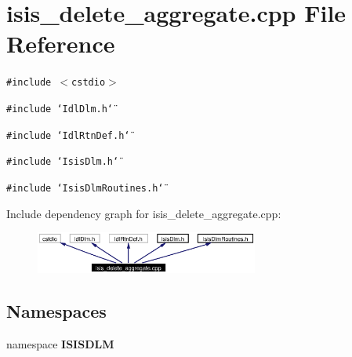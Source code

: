 \section{isis\_\-delete\_\-aggregate.cpp File Reference}
\label{isis__delete__aggregate_8cpp}
{\tt \#include $<$cstdio$>$}\par
{\tt \#include \char`\"{}Idl\-Dlm.h\char`\"{}}\par
{\tt \#include \char`\"{}Idl\-Rtn\-Def.h\char`\"{}}\par
{\tt \#include \char`\"{}Isis\-Dlm.h\char`\"{}}\par
{\tt \#include \char`\"{}Isis\-Dlm\-Routines.h\char`\"{}}\par


Include dependency graph for isis\_\-delete\_\-aggregate.cpp:\begin{figure}[H]
\begin{center}
\leavevmode
\includegraphics[width=208pt]{isis__delete__aggregate_8cpp__incl}
\end{center}
\end{figure}
\subsection*{Namespaces}
\begin{CompactItemize}
\item 
namespace {\bf ISISDLM}
\end{CompactItemize}
